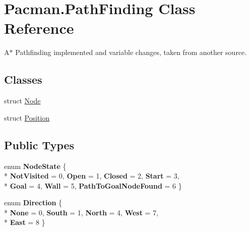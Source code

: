 \hypertarget{class_pacman_1_1_path_finding}{\section{Pacman.\-Path\-Finding Class Reference}
\label{class_pacman_1_1_path_finding}
}


A$\ast$ Pathfinding implemented and variable changes, taken from another source.  


\subsection*{Classes}
\begin{DoxyCompactItemize}
\item 
struct \hyperlink{struct_pacman_1_1_path_finding_1_1_node}{Node}
\item 
struct \hyperlink{struct_pacman_1_1_path_finding_1_1_position}{Position}
\end{DoxyCompactItemize}
\subsection*{Public Types}
\begin{DoxyCompactItemize}
\item 
enum {\bfseries Node\-State} \{ \\*
{\bfseries Not\-Visited} = 0, 
{\bfseries Open} = 1, 
{\bfseries Closed} = 2, 
{\bfseries Start} = 3, 
\\*
{\bfseries Goal} = 4, 
{\bfseries Wall} = 5, 
{\bfseries Path\-To\-Goal\-Node\-Found} = 6
 \}
\item 
enum {\bfseries Direction} \{ \\*
{\bfseries None} = 0, 
{\bfseries South} = 1, 
{\bfseries North} = 4, 
{\bfseries West} = 7, 
\\*
{\bfseries East} = 8
 \}
\end{DoxyCompactItemize}
